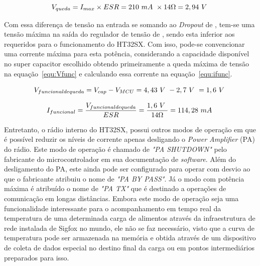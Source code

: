 \begin{equation}
    V_{queda} = I_{max}\times ESR = 210~mA~ \times 14\Omega = 2,94~V~
  \label{equ:esrqueda}
\end{equation}

Com essa diferença de tensão na entrada se somando ao \textit{Dropout} de \DropV, tem-se uma tensão máxima na saída do regulador de tensão de \VoutMin, sendo esta inferior aos \VmcuMin requeridos para o funcionamento do HT32SX. Com isso, pode-se convencionar uma corrente máxima para esta potência, considerando a capacidade disponível no super capacitor escolhido obtendo primeiramente a queda máxima de tensão na equação~\ref{equ:Vfunc} e calculando essa corrente na equação~\ref{equ:ifunc}.

\begin{equation}
   V_{funcional de queda} =  V_{cap} - V_{MCU} = 4,43~V~ - 2,7~V~ = 1,6~V~
  \label{equ:Vfunc}
\end{equation}

\begin{equation}
   I_{funcional} = \frac{V_{funcional de queda}}{ESR} = \frac{1,6~V~}{14\Omega} = 114,28~mA~
  \label{equ:ifunc}
\end{equation}

Entretanto, o rádio interno do HT32SX, possui outros modos de operação em que é possível reduzir os níveis de corrente apenas desligando o \textit{Power Amplifier} (PA) do rádio. Este modo de operação é chamado de \textit{"PA SHUTDOWN"} pelo fabricante do microcontrolador em sua documentação de \textit{software}. Além do desligamento do PA, este ainda pode ser configurado para operar com desvio ao que o fabricante atribuiu o nome de \textit{"PA BY PASS"}. Já o modo com potência máxima é atribuído o nome de \textit{"PA TX"} que é destinado a operações de comunicação em longas distâncias. Embora este modo de operação seja uma funcionalidade interessante para o acompanhamento em tempo real da temperatura de uma determinada carga de alimentos através da infraestrutura de rede instalada de Sigfox no mundo, ele não se faz necessário, visto que a curva de temperatura pode ser armazenada na memória e obtida através de um dispositivo de coleta de dados especial no destino final da carga ou em pontos intermediários preparados para isso.

